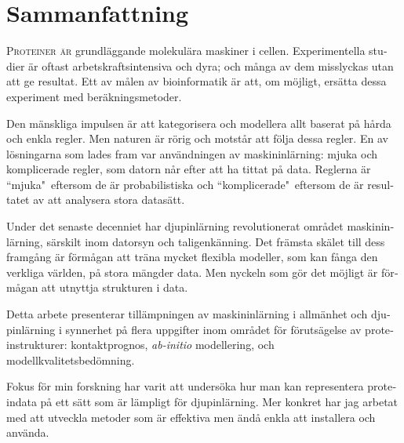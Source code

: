 \chapter*{Sammanfattning}
\begin{otherlanguage}{swedish}
\lettrine[lines=3, lhang=0.15, nindent=0em, findent=2pt]{\color{Maroon}P}{roteiner är }
grundläggande molekulära maskiner i cellen. Experimentella studier är oftast arbetskraftsintensiva och dyra; och många av dem misslyckas utan att ge resultat. Ett av målen av bioinformatik är att, om möjligt, ersätta dessa experiment med beräkningsmetoder.

Den mänskliga impulsen är att kategorisera och modellera allt baserat på hårda och enkla regler.
Men naturen är rörig och motstår att följa dessa regler.
En av lösningarna som lades fram var användningen av maskininlärning: mjuka och komplicerade regler, som datorn når efter att ha tittat på data.
Reglerna är ``mjuka"\ eftersom de är probabilistiska och ``komplicerade"\ eftersom de är resultatet av att analysera stora datasätt.

Under det senaste decenniet har djupinlärning revolutionerat området maskininlärning, särskilt inom datorsyn och taligenkänning. Det främsta skälet till dess framgång är förmågan att träna mycket flexibla modeller, som kan fånga den verkliga världen, på stora mängder data. Men nyckeln som gör det möjligt är förmågan att utnyttja strukturen i data.

Detta arbete presenterar tillämpningen av maskininlärning i allmänhet och djupinlärning i synnerhet på flera uppgifter inom området för förutsägelse av proteinstrukturer: kontaktprognos, \emph{ab-initio} modellering, och modellkvalitetsbedömning.

Fokus för min forskning har varit att undersöka hur man kan representera proteindata på ett sätt som är lämpligt för djupinlärning. Mer konkret har jag arbetat med att utveckla metoder som är effektiva men ändå enkla att installera och använda.
\end{otherlanguage}